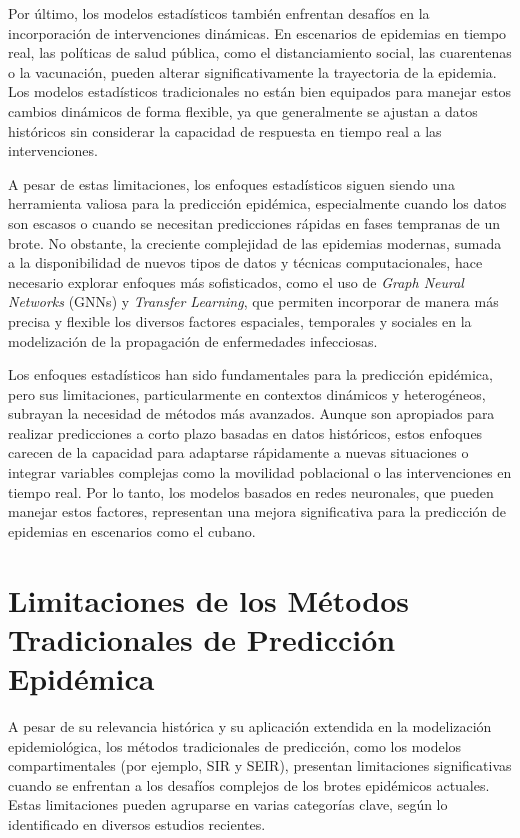 Por último, los modelos estadísticos también enfrentan desafíos en la incorporación de intervenciones dinámicas. En escenarios de epidemias en tiempo real, las políticas de salud pública, como el distanciamiento social, las cuarentenas o la vacunación, pueden alterar significativamente la trayectoria de la epidemia. Los modelos estadísticos tradicionales no están bien equipados para manejar estos cambios dinámicos de forma flexible, ya que generalmente se ajustan a datos históricos sin considerar la capacidad de respuesta en tiempo real a las intervenciones\parencite{Shinde2020ForecastingCOVID, Rodriguez2022DataCentric}.

A pesar de estas limitaciones, los enfoques estadísticos siguen siendo una herramienta valiosa para la predicción epidémica, especialmente cuando los datos son escasos o cuando se necesitan predicciones rápidas en fases tempranas de un brote. No obstante, la creciente complejidad de las epidemias modernas, sumada a la disponibilidad de nuevos tipos de datos y técnicas computacionales, hace necesario explorar enfoques más sofisticados, como el uso de \textit{Graph Neural Networks} (GNNs) y \textit{Transfer Learning}, que permiten incorporar de manera más precisa y flexible los diversos factores espaciales, temporales y sociales en la modelización de la propagación de enfermedades infecciosas\parencite{Rodriguez2022DataCentric, Panagopoulos_Nikolentzos_Vazirgiannis_2021}.

Los enfoques estadísticos han sido fundamentales para la predicción epidémica, pero sus limitaciones, particularmente en contextos dinámicos y heterogéneos, subrayan la necesidad de métodos más avanzados. Aunque son apropiados para realizar predicciones a corto plazo basadas en datos históricos, estos enfoques carecen de la capacidad para adaptarse rápidamente a nuevas situaciones o integrar variables complejas como la movilidad poblacional o las intervenciones en tiempo real. Por lo tanto, los modelos basados en redes neuronales, que pueden manejar estos factores, representan una mejora significativa para la predicción de epidemias en escenarios como el cubano\parencite{Nguyen2023NZSTGNN, Zheng2024HeatGNN}.

\section{Limitaciones de los Métodos Tradicionales de Predicción Epidémica}

A pesar de su relevancia histórica y su aplicación extendida en la modelización epidemiológica, los métodos tradicionales de predicción, como los modelos compartimentales (por ejemplo, SIR y SEIR), presentan limitaciones significativas cuando se enfrentan a los desafíos complejos de los brotes epidémicos actuales\cite{Kermack1927ACT, Burke2024OriginsSEIR}. Estas limitaciones pueden agruparse en varias categorías clave, según lo identificado en diversos estudios recientes.

